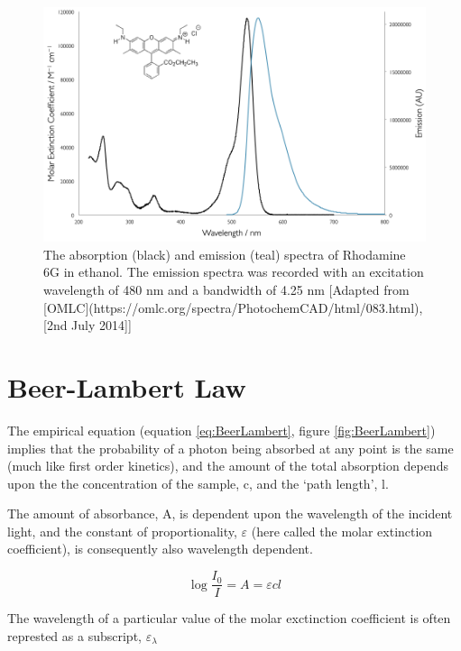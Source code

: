 \documentclass[
]{book}
\begin{document}
\begin{figure}

{\centering \includegraphics[width=0.6\linewidth]{images/Rhodamine6GAbsEm} 

}

\caption{The absorption (black) and emission (teal) spectra of Rhodamine 6G in ethanol. The emission spectra was recorded with an excitation wavelength of 480 nm and a bandwidth of 4.25 nm [Adapted from [OMLC](https://omlc.org/spectra/PhotochemCAD/html/083.html), [2nd July 2014]]}\label{fig:RhoAbsEm}
\end{figure}

\hypertarget{sec:BeerLambert}{%
\section{Beer-Lambert Law}\label{sec:BeerLambert}}

The empirical equation (equation \eqref{eq:BeerLambert}, figure \ref{fig:BeerLambert}) implies that the probability of a photon being absorbed at any point is the same (much like first order kinetics), and the amount of the total absorption depends upon the the concentration of the sample, c, and the `path length', l.

The amount of absorbance, A, is dependent upon the wavelength of the incident light, and the constant of proportionality, \(\varepsilon\) (here called the molar extinction coefficient), is consequently also wavelength dependent.

\begin{equation}
\log \frac{I_0}{I}=A=\varepsilon cl
\label{eq:BeerLambert}
\end{equation}

The wavelength of a particular value of the molar exctinction coefficient is often represted as a subscript, \(\varepsilon _\lambda\)
\end{document}
